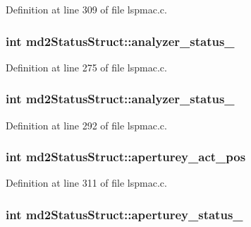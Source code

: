 Definition at line 309 of file lspmac.\-c.

\hypertarget{structmd2StatusStruct_ab876b484f55bcce576fcd89dcc3f7267}{
\subsubsection[{analyzer\-\_\-status\-\_\-1}]{\setlength{\rightskip}{0pt plus 5cm}int md2\-Status\-Struct\-::analyzer\-\_\-status\-\_}}\label{structmd2StatusStruct_ab876b484f55bcce576fcd89dcc3f7267}


Definition at line 275 of file lspmac.\-c.

\hypertarget{structmd2StatusStruct_a4f88bb778e4e18f1fbf7672ac11e7433}{
\subsubsection[{analyzer\-\_\-status\-\_\-2}]{\setlength{\rightskip}{0pt plus 5cm}int md2\-Status\-Struct\-::analyzer\-\_\-status\-\_}}\label{structmd2StatusStruct_a4f88bb778e4e18f1fbf7672ac11e7433}


Definition at line 292 of file lspmac.\-c.

\hypertarget{structmd2StatusStruct_a2a434d2b57dbb669de0765486a1516ff}{
\subsubsection[{aperturey\-\_\-act\-\_\-pos}]{\setlength{\rightskip}{0pt plus 5cm}int md2\-Status\-Struct\-::aperturey\-\_\-act\-\_\-pos}}\label{structmd2StatusStruct_a2a434d2b57dbb669de0765486a1516ff}


Definition at line 311 of file lspmac.\-c.

\hypertarget{structmd2StatusStruct_a2ef953eaddf7058bf4276585e6ff066b}{
\subsubsection[{aperturey\-\_\-status\-\_\-1}]{\setlength{\rightskip}{0pt plus 5cm}int md2\-Status\-Struct\-::aperturey\-\_\-status\-\_}}\label{structmd2StatusStruct_a2ef953eaddf7058bf4276585e6ff066b}


